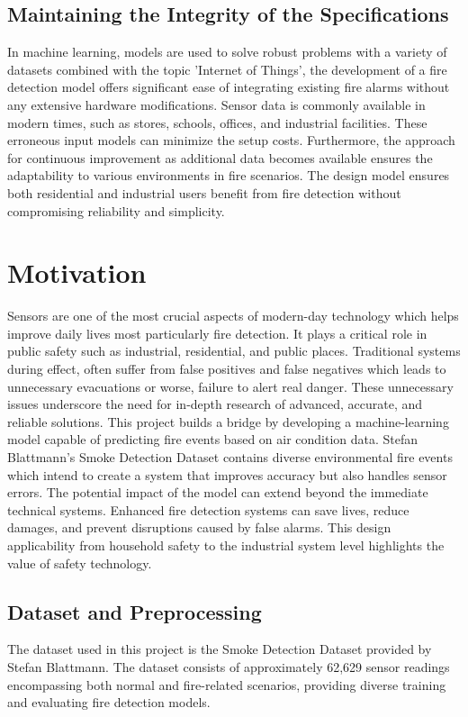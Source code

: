\documentclass[conference]{IEEEtran}
\begin{document}
\subsection{Maintaining the Integrity of the Specifications}

In machine learning, models are used to solve robust
problems with a variety of datasets combined with the topic
'Internet of Things', the development of a fire detection
model offers significant ease of integrating existing fire
alarms without any extensive hardware modifications. Sensor
data is commonly available in modern times, such as stores,
schools, offices, and industrial facilities. These erroneous
input models can minimize the setup costs. Furthermore, the
approach for continuous improvement as additional data
becomes available ensures the adaptability to various
environments in fire scenarios. The design model ensures
both residential and industrial users benefit from fire
detection without compromising reliability and simplicity.   

\section{Motivation}
Sensors are one of the most crucial aspects of modern-day
technology which helps improve daily lives most particularly
fire detection. It plays a critical role in public safety
such as industrial, residential, and public places.
Traditional systems during effect, often suffer from false
positives and false negatives which leads to unnecessary
evacuations or worse, failure to alert real danger. These
unnecessary issues underscore the need for in-depth research
of advanced, accurate, and reliable solutions. This project
builds a bridge by developing a machine-learning model
capable of predicting fire events based on air condition
data. Stefan Blattmann's Smoke Detection Dataset contains
diverse environmental fire events which intend to create a
system that improves accuracy but also handles sensor
errors. The potential impact of the model can extend beyond
the immediate technical systems. Enhanced fire detection
systems can save lives, reduce damages, and prevent
disruptions caused by false alarms. This design
applicability from household safety to the industrial system
level highlights the value of safety technology. 


\subsection{Dataset and Preprocessing}\label{AA} The dataset
used in this project is the Smoke Detection Dataset provided
by Stefan Blattmann. The dataset consists of approximately
62,629 sensor readings encompassing both normal and
fire-related scenarios, providing diverse training and
evaluating fire detection models.
\end{document}

